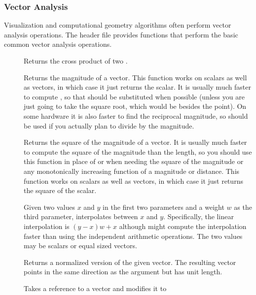 \subsubsection{Vector Analysis}

Visualization and computational geometry algorithms often perform vector
analysis operations. The  header file
provides functions that perform the basic common vector analysis
operations.

\begin{description}
\item[]  Returns the cross product of
  two .
\item[] Returns the magnitude of a vector. This function
  works on scalars as well as vectors, in which case it just returns the
  scalar. It is usually much faster to compute
  , so that should be substituted when
  possible (unless you are just going to take the square root, which would
  be besides the point). On some hardware it is also faster to find the
  reciprocal magnitude, so  should be used if
  you actually plan to divide by the magnitude.
\item[] Returns the square of the magnitude of a
  vector. It is usually much faster to compute the square of the magnitude
  than the length, so you should use this function in place of
   or  when needing
  the square of the magnitude or any monotonically increasing function of a
  magnitude or distance. This function works on scalars as well as vectors,
  in which case it just returns the square of the scalar.
\item[]  Given two values $x$ and
  $y$ in the first two parameters and a  weight $w$ as the
  third parameter, interpolates between $x$ and $y$. Specifically, the
  linear interpolation is $(y-x)w + x$ although  might
  compute the interpolation faster than using the independent arithmetic
  operations. The two values may be scalars or equal sized vectors.
\item[] Returns a normalized version of the given
  vector. The resulting vector points in the same direction as the argument
  but has unit length.
\item[] Takes a reference to a vector and modifies it to

\end{description}
